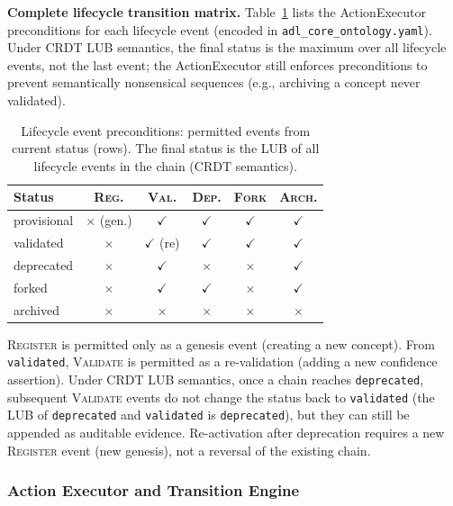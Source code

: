 \textbf{Complete lifecycle transition matrix.} Table~\ref{tab:lifecycle-matrix} lists the ActionExecutor preconditions for each lifecycle event (encoded in \texttt{adl\_core\_ontology.yaml}). Under CRDT LUB semantics, the final status is the maximum over all lifecycle events, not the last event; the ActionExecutor still enforces preconditions to prevent semantically nonsensical sequences (e.g., archiving a concept never validated).

\begin{table}[htbp]
\centering
\footnotesize
\caption{Lifecycle event preconditions: permitted events from current status (rows). The final status is the LUB of all lifecycle events in the chain (CRDT semantics).}
\label{tab:lifecycle-matrix}
\begin{tabular}{@{}p{2cm}ccccc@{}}
\toprule
\textbf{Status} & \textsc{Reg.} & \textsc{Val.} & \textsc{Dep.} & \textsc{Fork} & \textsc{Arch.} \\
\midrule
provisional & $\times$ (gen.) & $\checkmark$ & $\checkmark$ & $\checkmark$ & $\checkmark$ \\
validated & $\times$ & $\checkmark$ (re) & $\checkmark$ & $\checkmark$ & $\checkmark$ \\
deprecated & $\times$ & $\checkmark$ & $\times$ & $\times$ & $\checkmark$ \\
forked & $\times$ & $\checkmark$ & $\checkmark$ & $\times$ & $\checkmark$ \\
archived & $\times$ & $\times$ & $\times$ & $\times$ & $\times$ \\
\bottomrule
\end{tabular}
\end{table}

\textsc{Register} is permitted only as a genesis event (creating a new concept). From \texttt{validated}, \textsc{Validate} is permitted as a re-validation (adding a new confidence assertion). Under CRDT LUB semantics, once a chain reaches \texttt{deprecated}, subsequent \textsc{Validate} events do not change the status back to \texttt{validated} (the LUB of \texttt{deprecated} and \texttt{validated} is \texttt{deprecated}), but they can still be appended as auditable evidence. Re-activation after deprecation requires a new \textsc{Register} event (new genesis), not a reversal of the existing chain.

\subsubsection{Action Executor and Transition Engine}\label{subsubsec:action-consensus}

